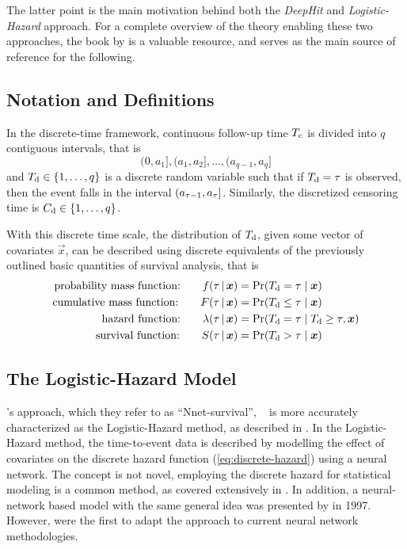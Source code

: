 The latter point is the main motivation behind both 
the \emph{DeepHit} and \emph{Logistic-Hazard} approach.
For a complete overview of the theory enabling these two approaches,
the book by \textcite{tutzModeling2016} is a valuable resource, 
and serves as the main source of reference for the following.

\subsection{Notation and Definitions}

In the discrete-time framework, 
continuous follow-up time \({T_{\mathrm{c}}}\) is divided into \(q\) contiguous intervals,
that is
%
\begin{equation*}
	(0, a_1], (a_1, a_2], \dots, (a_{q-1}, a_q]
\end{equation*}
%
and \({T_{\mathrm{d}}} \in \{1, \dots, q\}\) is a discrete random  variable
such that if \({T_{\mathrm{d}}} = \tau\) is observed, then the event 
falls in the interval \((a_{\tau-1}, a_{\tau}]\).
Similarly, the discretized censoring time is \({C_{\mathrm{d}}} \in \{1, \dots, q\}\).

With this discrete time scale, 
the distribution of \({T_{\mathrm{d}}}\), 
given some vector of covariates \(\vec{x}\),
can be described using discrete equivalents of the previously 
outlined basic quantities of survival analysis, that is
%
\begin{align}
    \text{probability mass function:} \qquad
    f(\tid \giv \vec{x}) 
    &= \PR (\Tid = \tid \mid \vec{x}) \\
    \text{cumulative mass function:} \qquad
    F(\tid \giv \vec{x}) 
    &= \PR (\Tid \leq \tid \mid \vec{x}) \\
    \label{eq:discrete-hazard}
    \text{hazard function:} \qquad
    \lambda(\tid \giv \vec{x}) 
    &= \PR (\Tid = \tid \mid \Tid \geq \tid, \vec{x}) \\
    \text{survival function:} \qquad
    S(\tid \giv \vec{x}) 
    &= \PR (\Tid > \tid \mid \vec{x})
\end{align}

\subsection{The Logistic-Hazard Model}

's approach, 
which they refer to as \enquote{Nnet-survival},
~\autocite{gensheimerScalable2019}
is more accurately characterized as the Logistic-Hazard method, 
as described in \textcite{kvammeContinuous2021}.
In the Logistic-Hazard method, 
the time-to-event data is described by 
modelling the effect of covariates on the discrete hazard function 
(\cref{eq:discrete-hazard}) 
using a neural network.
The concept is not novel, 
employing the discrete hazard for statistical modeling is a common method, 
as covered extensively in \textcite{tutzModeling2016}. 
In addition, a neural-network based model with the same general idea 
was presented by \citeauthor{brownUse1997} in 1997.
~\autocite{brownUse1997}
However, 
\citeauthor{gensheimerScalable2019} were the first to adapt the approach
to current neural network methodologies.

